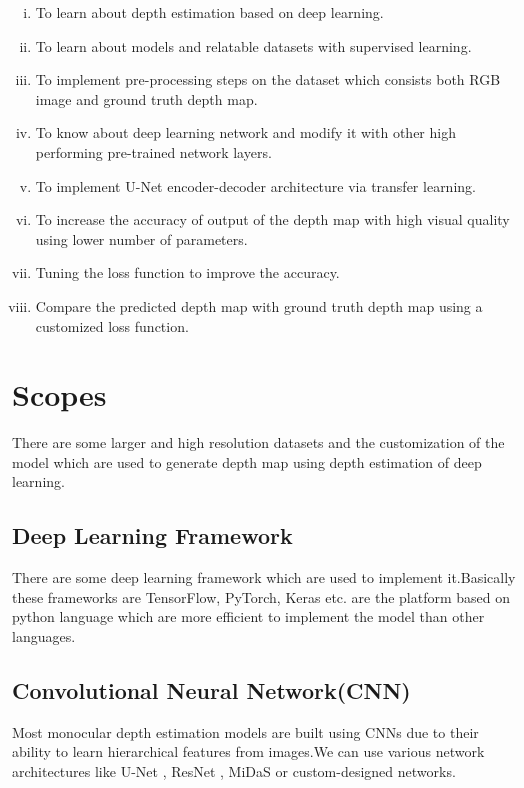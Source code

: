 \documentclass[a4paper,12pt,oneside]{book}
\begin{document}
\begin{singlespacing}
\begin{enumerate}[i.]
    \item To learn about depth estimation based on deep learning.
    \item To learn about models and relatable datasets with supervised learning.
    \item To implement pre-processing steps on the dataset which consists both RGB image and ground truth depth map.
    \item To know about deep learning network and modify it with other high performing pre-trained network layers.
    \item To implement U-Net encoder-decoder architecture via transfer learning.
    \item To increase the accuracy of output of the depth map with high visual quality using lower number of parameters.
    \item Tuning the loss function to improve the accuracy.
    \item Compare the predicted depth map with ground truth depth map using a customized loss function.
\end{enumerate}
\end{singlespacing}

\section{Scopes}
There are some larger and high resolution datasets and the customization of the model which are used to generate depth map using depth estimation of deep learning.
\subsection{Deep Learning Framework}
There are some deep learning framework which are used to implement it.Basically these frameworks are TensorFlow, PyTorch, Keras etc. are the platform based on python language 
which are more efficient to implement the model than other languages.
\subsection{Convolutional Neural Network(CNN)}
Most monocular depth estimation models are built using CNNs due to their ability to learn hierarchical features from images.We can use various network architectures like U-Net \cite{unetwotk}, ResNet \cite{resnetwork}, MiDaS or custom-designed networks.
\end{document}
